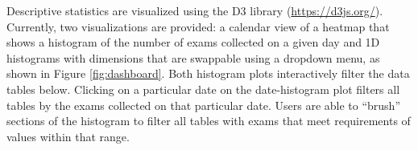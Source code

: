 Descriptive statistics are visualized using the D3 library (\href{https://d3js.org/}{https://d3js.org/}). Currently, two visualizations are provided: a calendar view of a heatmap that shows a histogram of the number of exams collected on a given day and 1D histograms with dimensions that are swappable using a dropdown menu, as shown in Figure \ref{fig:dashboard}. Both histogram plots interactively filter the data tables below. Clicking on a particular date on the date-histogram plot filters all tables by the exams collected on that particular date. Users are able to ``brush'' sections of the histogram to filter all tables with exams that meet requirements of values within that range.  